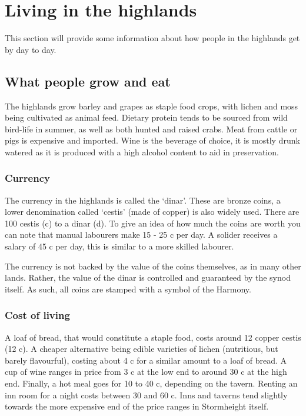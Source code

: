 \documentclass[a4paper,11pt,oneside]{book}
\begin{document}
\section{Living in the highlands}
This section will provide some information about how people in the highlands get by day to day.

\subsection{What people grow and eat}
The highlands grow barley and grapes as staple food crops, with lichen and moss being cultivated as animal feed. Dietary protein tends to be sourced from wild bird-life in summer, as well as both hunted and raised crabs. Meat from cattle or pigs is expensive and imported. Wine is the beverage of choice, it is mostly drunk watered as it is produced with a high alcohol content to aid in preservation. 

\subsubsection{Currency}
The currency in the highlands is called the `dinar'. These are bronze coins, a lower denomination called `cestis' (made of copper) is also widely used. There are 100 cestis (c) to a dinar (d). To give an idea of how much the coins are worth you can note that manual labourers make 15 - 25 c per day. A solider receives a salary of 45 c per day, this is similar to a more skilled labourer. 

The currency is not backed by the value of the coins themselves, as in many other lands. Rather, the value of the dinar is controlled and guaranteed by the synod itself. As such, all coins are stamped with a symbol of the Harmony. 

\subsubsection{Cost of living}
A loaf of bread, that would constitute a staple food, costs around 12 copper cestis (12 c). A cheaper alternative being edible varieties of lichen (nutritious, but barely flavourful), costing about 4 c for a similar amount to a loaf of bread. A cup of wine ranges in price from 3 c at the low end to around 30 c at the high end. Finally, a hot meal goes for 10 to 40 c, depending on the tavern. Renting an inn room for a night costs between 30 and 60 c. Inns and taverns tend slightly towards the more expensive end of the price ranges in Stormheight itself.  
\end{document}
